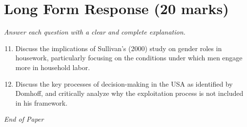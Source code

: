 \documentclass[12pt]{article}
\begin{document}
\section*{Long Form Response (20 marks)}
\textit{Answer each question with a clear and complete explanation.}
\begin{enumerate}[label=\arabic*.]
\setcounter{enumi}{10}
\item Discuss the implications of Sullivan's (2000) study on gender roles in housework, particularly focusing on the conditions under which men engage more in household labor.
\item Discuss the key processes of decision-making in the USA as identified by Domhoff, and critically analyze why the exploitation process is not included in his framework.
\end{enumerate}

\vfill
\noindent\textit{End of Paper}
\end{document}
